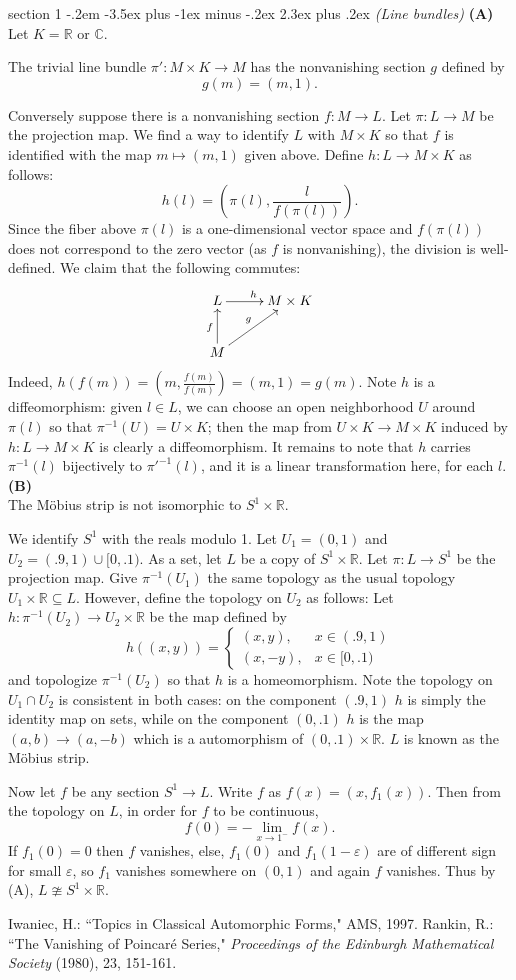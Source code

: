 \documentclass[12pt]{article}
\makeatletter
\theoremstyle{norm}
\newcommand{\C}[0]{\mathbb{C}}
\newcommand{\R}[0]{\mathbb{R}}
\newcommand{\subeq}[0]{\subseteq}
\newcommand{\ep}[0]{\varepsilon}
\newcommand{\pa}[1]{\left( {#1} \right)}
\newcommand{\subprob}[1]{\noindent\textbf{#1}\\}
\newenvironment{problem}{\@startsection
       {section}
       {1}
       {-.2em}
       {-3.5ex plus -1ex minus -.2ex}
       {2.3ex plus .2ex}
       {\pagebreak[3]%
       \large\bf\noindent{Problem }
       }
       }
       {%
       }
\makeatother
\begin{document}
\begin{problem}{\it (Line bundles)}
\subprob{(A)}
Let $K=\R$ or $\C$.

The trivial line bundle $\pi':M\times K\to M$ has the nonvanishing section $g$ defined by
\[g(m)=(m,1).\]

Conversely suppose there is a nonvanishing section $f:M\to L$. Let $\pi:L\to M$ be the projection map. We find a way to identify $L$ with $M\times K$ so that $f$ is identified with the map $m\mapsto (m,1)$ given above. Define $h:L\to M\times K$ as follows: 
\[
h(l)=\pa{\pi(l),\frac{l}{f(\pi(l))}}.
\]
Since the fiber above $\pi(l)$ is a one-dimensional vector space and $f(\pi(l))$ does not correspond to the zero vector (as $f$ is nonvanishing), the division is well-defined. We claim that the following commutes:
\[
\xymatrix{
L\ar^h[r]& M\times K\\
M\ar^f[u]\ar^g[ru]
}
\]
Indeed, $h(f(m))=\pa{m,\frac{f(m)}{f(m)}}=(m,1)=g(m)$. Note $h$ is a diffeomorphism: given $l\in L$, we can choose an open neighborhood $U$ around $\pi(l)$ so that $\pi^{-1}(U)=U\times K$; then the map from $U\times K\to M\times K$ induced by $h:L\to M\times K$ is clearly a diffeomorphism.
It remains to note that $h$ carries $\pi^{-1}(l)$ bijectively to $\pi'^{-1}(l)$, and it is a linear transformation here, for each $l$.\\

\subprob{(B)}
The M\"obius strip is not isomorphic to $S^1\times \R$.

We identify $S^1$ with the reals modulo 1. 
Let $U_1=(0,1)$ and $U_2=(.9,1)\cup [0,.1)$. As a set, let $L$ be a copy of $S^1\times \R$. Let $\pi:L\to S^1$ be the projection map.
Give $\pi^{-1}(U_1)$ the same topology as the usual topology $U_1\times \R\subeq L$. %
However, define the topology on $U_2$ as follows: Let $h:\pi^{-1}(U_2)\to U_2\times \R$ be the map defined by
\[
h((x,y))=\begin{cases}
(x,y),&x\in (.9,1)\\
(x,-y),&x\in [0,.1)
\end{cases}
\]
and topologize $\pi^{-1}(U_2)$ so that $h$ is a homeomorphism. Note the topology on $U_1\cap U_2$ is consistent in both cases: on the component $(.9,1)$ $h$ is simply the identity map on sets, while on the component $(0,.1)$ $h$ is the map $(a,b)\to (a,-b)$ which is a automorphism of $(0,.1)\times \R$. $L$ is known as the M\"obius strip.

Now let $f$ be any section $S^1\to L$. Write $f$ as $f(x)=(x,f_1(x))$. Then from the topology on $L$, in order for $f$ to be continuous,
\[
f(0)=-\lim_{x\to 1^-}f(x).
\]
If $f_1(0)=0$ then $f$ vanishes, else, $f_1(0)$ and $f_1(1-\ep)$ are of different sign for small $\ep$, so $f_1$ vanishes somewhere on $(0,1)$ and again $f$ vanishes. Thus by (A), $L\ncong S^1\times \R$. 
\end{problem}
\begin{thebibliography}{9}
 Iwaniec, H.: ``Topics in Classical Automorphic Forms," AMS, 1997.
 Rankin, R.: ``The Vanishing of Poincar\'e Series," {\it Proceedings of the Edinburgh Mathematical Society} (1980), 23, 151-161.
\end{thebibliography}
\end{document}
